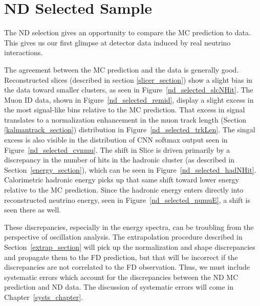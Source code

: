 \section{ND Selected Sample}
\label{nd_selection_section}

The ND selection gives an opportunity to compare the MC prediction
to data.
This gives us our first glimpse at detector data induced
by real neutrino interactions.

The agreement between the MC prediction and the data is generally good.
Reconstructed slices (described in section \ref{slicer_section})
show a slight bias in the data toward smaller clusters, as seen in
Figure~\ref{nd_selected_slcNHit}.
The Muon ID data, shown in Figure~\ref{nd_selected_remid}, display
a slight excess in the most signal-like bins relative to the MC prediction.
That excess in signal translates to a normalization enhancement in the
muon track length (Section \ref{kalmantrack_section})
distribution in Figure~\ref{nd_selected_trkLen}.
The singal excess is also visible in the distribution of CNN softmax output
seen in Figure~\ref{nd_selected_cvnmu}.
The shift in Slice \nhit is driven primarily by a discrepancy
in the number of hits in the hadronic cluster (as described in
Section~\ref{energy_section}), which can be seen in Figure~\ref{nd_selected_hadNHit}.
Calorimetric hadronic energy picks up that same shift toward lower energy
relative to the MC prediction.
Since the hadronic energy enters directly into reconstructed neutrino energy,
seen in Figure~\ref{nd_selected_numuE}, a shift is seen there as well.

These discrepancies, especially in the energy spectra,
can be troubling from the perspective of oscillation
analysis.
The extrapolation procedure described in Section~\ref{extrap_section}
will pick up the normalization and shape discrepancies and propagate them
to the FD prediction, but that will be incorrect if the discrepancies
are not correlated to the FD observation.
Thus, we must include systematic errors which account for the discrepancies
between the ND MC prediction and ND data.
The discussion of systematic errors will come in Chapter~\ref{systs_chapter}.

